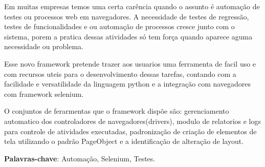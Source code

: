 %
%

\begin{RESUMO}
\thispagestyle{empty}
	\begin{SingleSpace}


		Em muitas empresas temos uma certa carência quando o assunto é automação de testes ou processos web em navegadores. A necessidade de testes de regressão, testes de funcionalidades e ou
        automação de processos cresce junto com o sistema, porem a pratica dessas atividades só tem força quando aparece aguma necessidade ou problema.

        Esse novo framework pretende trazer aos usuarios uma ferramenta de facil uso e com recursos uteis para o desenvolvimento dessas tarefas, contando com a facilidade e versatilidade da
        linguagem python e a integração com navegadores com framework selenium.

        O conjuntos de ferarmentas que o framework dispõe são: gerenciamento automatico dos controladores de navegadores(drivers), modulo de relatorios e logs para controle de atividades executadas,
        padronização de criação de elementos de tela utilizando o padrão PageObject e a identificação de alteração de layout.

		\vspace*{0.5cm}\hspace{-1.3 cm}\textbf{Palavras-chave}: Automação, Selenium, Testes.

	\end{SingleSpace}
\end{RESUMO}


